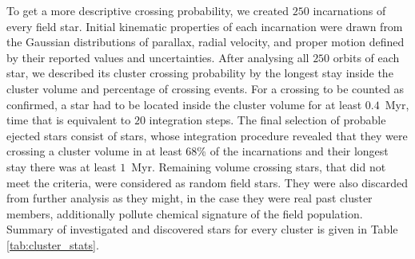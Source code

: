 To get a more descriptive crossing probability, we created $250$ incarnations of every field star. Initial kinematic properties of each incarnation were drawn from the Gaussian distributions of parallax, radial velocity, and proper motion defined by their reported values and uncertainties. After analysing all $250$ orbits of each star, we described its cluster crossing probability by the longest stay inside the cluster volume and percentage of crossing events. For a crossing to be counted as confirmed, a star had to be located inside the cluster volume for at least $0.4$~Myr, time that is equivalent to $20$ integration steps. The final selection of probable ejected stars consist of stars, whose integration procedure revealed that they were crossing a cluster volume in at least $68$\% of the incarnations and their longest stay there was at least $1$~Myr. Remaining volume crossing stars, that did not meet the criteria, were considered as random field stars. They were also discarded from further analysis as they might, in the case they were real past cluster members, additionally pollute chemical signature of the field population. Summary of investigated and discovered stars for every cluster is given in Table \ref{tab:cluster_stats}.

